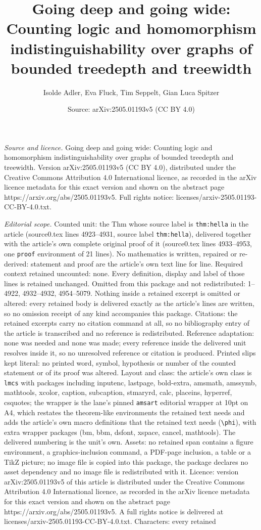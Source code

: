 \documentclass[10pt,a4paper]{amsart}
\title[Going deep and going wide: Counting logic and homomorphism i]{Going deep and going wide: Counting logic and homomorphism indistinguishability over graphs of bounded treedepth and treewidth}
\author{Isolde Adler, Eva Fluck, Tim Seppelt, Gian Luca Spitzer}
\date{Source: arXiv:2505.01193v5 (CC BY 4.0)}
\begin{document}
\maketitle

\noindent\emph{Source and licence.} Going deep and going wide: Counting logic and homomorphism indistinguishability over graphs of bounded treedepth and treewidth. Version arXiv:2505.01193v5 (CC BY 4.0), distributed under the Creative Commons Attribution 4.0 International licence, as recorded in the arXiv licence metadata for this exact version and shown on the abstract page https://arxiv.org/abs/2505.01193v5. Full rights notice: licenses/arxiv-2505.01193-CC-BY-4.0.txt.\par\smallskip

\noindent\textit{Editorial scope.} Counted unit: the Thm whose source label is \texttt{thm:hella} in the article (source0.tex lines 4923--4931, source label \texttt{thm:hella}), delivered together with the article's own complete original proof of it (source0.tex lines 4933--4953, one \texttt{proof} environment of 21 lines). No mathematics is written, repaired or re-derived: statement and proof are the article's own text line for line. Required context retained uncounted: none. Every definition, display and label of those lines is retained unchanged. Omitted from this package and not redistributed: 1--4922, 4932--4932, 4954--5079. Nothing inside a retained excerpt is omitted or altered: every retained body is delivered exactly as the article's lines are written, so no omission receipt of any kind accompanies this package. Citations: the retained excerpts carry no citation command at all, so no bibliography entry of the article is transcribed and no reference is redistributed. Reference adaptation: none was needed and none was made; every reference inside the delivered unit resolves inside it, so no unresolved reference or citation is produced. Printed slips kept literal: no printed word, symbol, hypothesis or number of the counted statement or of its proof was altered. Layout and class: the article's own class is \texttt{lmcs} with packages including inputenc, lastpage, bold-extra, amsmath, amssymb, mathtools, xcolor, caption, subcaption, stmaryrd, calc, placeins, hyperref, csquotes; the wrapper is the lane's pinned \texttt{amsart} editorial wrapper at 10pt on A4, which restates the theorem-like environments the retained text needs and adds the article's own macro definitions that the retained text needs (\texttt{\textbackslash phi}), with extra wrapper packages (bm, bbm, dsfont, xspace, cancel, mathtools). The delivered numbering is the unit's own. Assets: no retained span contains a figure environment, a graphics-inclusion command, a PDF-page inclusion, a table or a TikZ picture; no image file is copied into this package, the package declares no asset dependency and no image file is redistributed with it. Licence: version arXiv:2505.01193v5 of this article is distributed under the Creative Commons Attribution 4.0 International licence, as recorded in the arXiv licence metadata for this exact version and shown on the abstract page https://arxiv.org/abs/2505.01193v5. A full rights notice is delivered at licenses/arxiv-2505.01193-CC-BY-4.0.txt. Characters: every retained 
\end{document}
